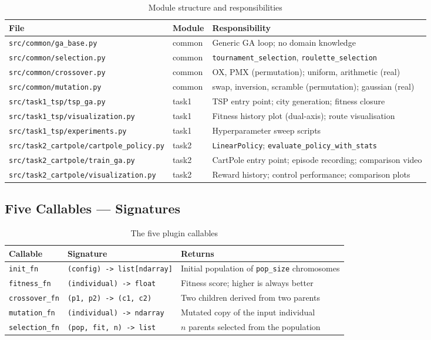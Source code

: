 \documentclass[12pt,a4paper]{article}
\begin{document}
\begin{table}[H]
\centering
\caption{Module structure and responsibilities}
\label{tab:modules}
\begin{tabularx}{\textwidth}{llX}
\toprule
\textbf{File} & \textbf{Module} & \textbf{Responsibility} \\
\midrule
\texttt{src/common/ga\_base.py} & common & Generic GA loop; no domain knowledge \\
\texttt{src/common/selection.py} & common & \texttt{tournament\_selection}, \texttt{roulette\_selection} \\
\texttt{src/common/crossover.py} & common & OX, PMX (permutation); uniform, arithmetic (real) \\
\texttt{src/common/mutation.py} & common & swap, inversion, scramble (permutation); gaussian (real) \\
\texttt{src/task1\_tsp/tsp\_ga.py} & task1 & TSP entry point; city generation; fitness closure \\
\texttt{src/task1\_tsp/visualization.py} & task1 & Fitness history plot (dual-axis); route visualisation \\
\texttt{src/task1\_tsp/experiments.py} & task1 & Hyperparameter sweep scripts \\
\texttt{src/task2\_cartpole/cartpole\_policy.py} & task2 & \texttt{LinearPolicy}; \texttt{evaluate\_policy\_with\_stats} \\
\texttt{src/task2\_cartpole/train\_ga.py} & task2 & CartPole entry point; episode recording; comparison video \\
\texttt{src/task2\_cartpole/visualization.py} & task2 & Reward history; control performance; comparison plots \\
\bottomrule
\end{tabularx}
\end{table}

\subsection{Five Callables — Signatures}

\begin{table}[H]
\centering
\caption{The five plugin callables}
\label{tab:callables}
\begin{tabularx}{\textwidth}{llX}
\toprule
\textbf{Callable} & \textbf{Signature} & \textbf{Returns} \\
\midrule
\texttt{init\_fn} & \texttt{(config) -> list[ndarray]} & Initial population of \texttt{pop\_size} chromosomes \\
\texttt{fitness\_fn} & \texttt{(individual) -> float} & Fitness score; higher is always better \\
\texttt{crossover\_fn} & \texttt{(p1, p2) -> (c1, c2)} & Two children derived from two parents \\
\texttt{mutation\_fn} & \texttt{(individual) -> ndarray} & Mutated copy of the input individual \\
\texttt{selection\_fn} & \texttt{(pop, fit, n) -> list} & $n$ parents selected from the population \\
\bottomrule
\end{tabularx}
\end{table}
\end{document}
